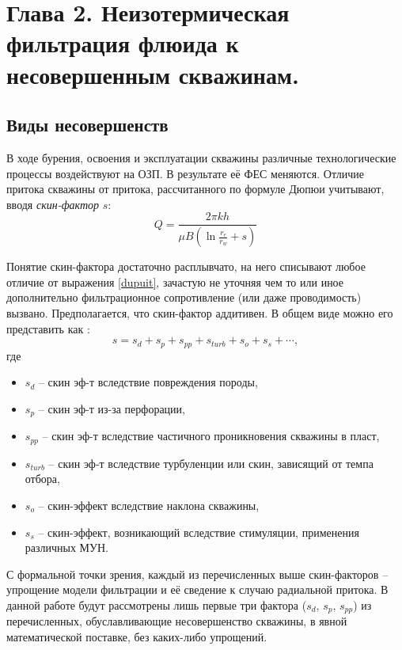 \section*{Глава 2. Неизотермическая фильтрация флюида к несовершенным скважинам.}

\setcounter{section}{2}
\setcounter{subsection}{0}
\setcounter{equation}{0}

\subsection{Виды несовершенств}
	В ходе бурения, освоения и эксплуатации скважины различные технологические процессы воздействуют на ОЗП.
	В результате её ФЕС меняются.
	Отличие притока скважины от притока, рассчитанного по формуле Дюпюи учитывают, вводя \textit{скин-фактор} $s$:
\begin{equation}
	\label{dupuit}
	Q = \frac{2\pi k h}{\mu B \left(\ln\displaystyle\frac{r_e}{r_w}+s\right)}
\end{equation}

	Понятие скин-фактора достаточно расплывчато, на него списывают любое отличие от выражения \eqref{dupuit}, зачастую не уточняя чем то или иное дополнительно фильтрационное сопротивление (или даже проводимость) вызвано. Предполагается, что скин-фактор аддитивен. В общем виде можно его представить как \cite{mukerdzhi}:
\begin{equation}
	\label{skin_full}
	s = s_d + s_p + s_{pp} + s_{turb} + s_o + s_s + \cdots,
\end{equation}
	где
\begin{itemize}
\item $s_d$ -- скин эф-т вследствие повреждения породы,
\item $s_p$ -- скин эф-т из-за перфорации,
\item $s_{pp}$ -- скин эф-т вследствие частичного проникновения скважины в пласт,
\item $s_{turb}$ -- скин эф-т вследствие турбуленции или скин, зависящий от темпа отбора,
\item $s_{o}$ -- скин-эффект вследствие наклона скважины,
\item $s_{s}$ -- скин-эффект, возникающий вследствие стимуляции, применения различных МУН.
\end{itemize}
	С формальной точки зрения, каждый из перечисленных выше скин-факторов -- упрощение модели фильтрации и её сведение к случаю радиальной притока. В данной работе будут рассмотрены лишь первые три фактора ($s_d$, $s_p$, $s_{pp}$) из перечисленных, обуславливающие несовершенство скважины, в явной математической поставке, без каких-либо упрощений.

